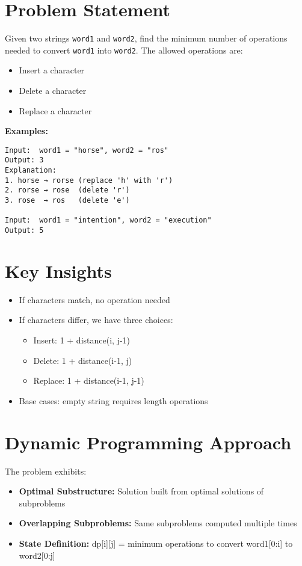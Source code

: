 
\label{problem:edit_distance}

\section*{Problem Statement}
Given two strings \texttt{word1} and \texttt{word2}, find the minimum number of operations needed to convert \texttt{word1} into \texttt{word2}. The allowed operations are:
\begin{itemize}
    \item Insert a character
    \item Delete a character
    \item Replace a character
\end{itemize}

\textbf{Examples:}
\begin{verbatim}
Input:  word1 = "horse", word2 = "ros"
Output: 3
Explanation: 
1. horse → rorse (replace 'h' with 'r')
2. rorse → rose  (delete 'r')
3. rose  → ros   (delete 'e')

Input:  word1 = "intention", word2 = "execution"
Output: 5
\end{verbatim}

\section*{Key Insights}
\begin{itemize}
    \item If characters match, no operation needed
    \item If characters differ, we have three choices:
        \begin{itemize}
            \item Insert: 1 + distance(i, j-1)
            \item Delete: 1 + distance(i-1, j)
            \item Replace: 1 + distance(i-1, j-1)
        \end{itemize}
    \item Base cases: empty string requires length operations
\end{itemize}

\section*{Dynamic Programming Approach}
The problem exhibits:
\begin{itemize}
    \item \textbf{Optimal Substructure:} Solution built from optimal solutions of subproblems
    \item \textbf{Overlapping Subproblems:} Same subproblems computed multiple times
    \item \textbf{State Definition:} dp[i][j] = minimum operations to convert word1[0:i] to word2[0:j]
\end{itemize}

